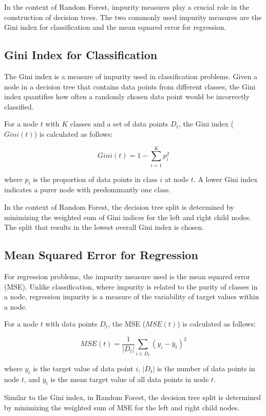 \documentclass{article}
\begin{document}
In the context of Random Forest, impurity measures play a crucial role in the construction of decision trees. The two commonly used impurity measures are the Gini index for classification and the mean squared error for regression.

\subsection{Gini Index for Classification}

The Gini index is a measure of impurity used in classification problems. Given a node in a decision tree that contains data points from different classes, the Gini index quantifies how often a randomly chosen data point would be incorrectly classified.

For a node \(t\) with \(K\) classes and a set of data points \(D_t\), the Gini index (\(Gini(t)\)) is calculated as follows:

\[ Gini(t) = 1 - \sum_{i=1}^{K} p_i^2 \]

where \(p_i\) is the proportion of data points in class \(i\) at node \(t\). A lower Gini index indicates a purer node with predominantly one class.

In the context of Random Forest, the decision tree split is determined by minimizing the weighted sum of Gini indices for the left and right child nodes. The split that results in the lowest overall Gini index is chosen.

\subsection{Mean Squared Error for Regression}

For regression problems, the impurity measure used is the mean squared error (MSE). Unlike classification, where impurity is related to the purity of classes in a node, regression impurity is a measure of the variability of target values within a node.

For a node \(t\) with data points \(D_t\), the MSE (\(MSE(t)\)) is calculated as follows:

\[ MSE(t) = \frac{1}{|D_t|} \sum_{i \in D_t} (y_i - \bar{y}_t)^2 \]

where \(y_i\) is the target value of data point \(i\), \(|D_t|\) is the number of data points in node \(t\), and \(\bar{y}_t\) is the mean target value of all data points in node \(t\).

Similar to the Gini index, in Random Forest, the decision tree split is determined by minimizing the weighted sum of MSE for the left and right child nodes.
\end{document}
